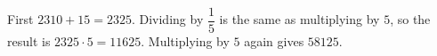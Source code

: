 First $2310+15=2325$. Dividing by $\dfrac{1}{5}$ is the same as multiplying by $5$, so the result is $2325\cdot5=11625$. Multiplying by $5$ again gives $\boxed{58125}$.
